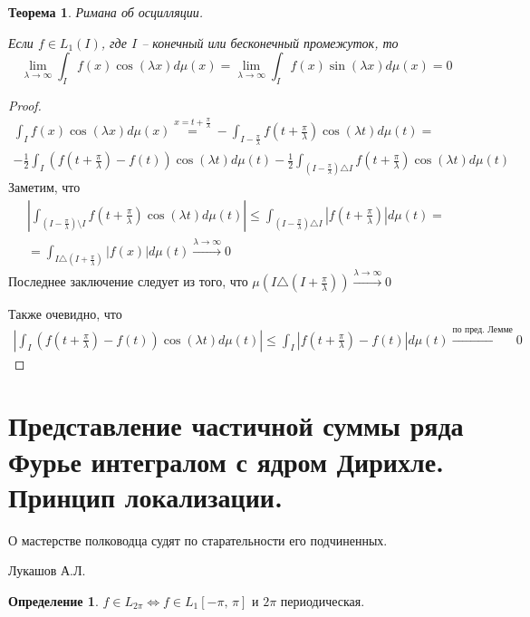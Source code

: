 \documentclass[a4paper,12pt]{article}
\renewcommand{\leq}{\ensuremath{\leqslant}}
\theoremstyle{plain}
\newtheorem{theorem}{Теорема}[section]
\theoremstyle{definition}
\newtheorem{definition}{Определение}[section]
\theoremstyle{remark}
\begin{document}
\begin{theorem}
	Римана об осцилляции.

	Если $f \in L_1(I)$, где $I$ -- конечный или бесконечный промежуток, то
	\[\lim_{\lambda \to \infty} \int_I f(x)\cos(\lambda x) d \mu(x) = \lim_{\lambda \to \infty} \int_I f(x) \sin (\lambda x) d\mu(x) = 0\]
\end{theorem}

\begin{proof}
	\begin{align*}
		\int_I f(x) \cos(\lambda x) d\mu(x) \stackrel{x = t + \frac{\pi}{\lambda}}{=} - \int_{I - \frac{\pi}{\lambda}} f\left( t + \frac{\pi}{\lambda} \right) \cos(\lambda t) d \mu(t) = \\
		-\frac{1}{2} \int_I \left(f\left(t + \frac{\pi}{\lambda}\right) - f(t) \right)\cos(\lambda t) d\mu(t) - \frac{1}{2} \int_{(I - \frac{\pi}{\lambda}) \triangle I} f\left(t + \frac{\pi}{\lambda}\right) \cos(\lambda t) d \mu(t)
	\end{align*}
	Заметим, что
	\begin{align*}
		\left|\int_{(I - \frac{\pi}{\lambda}) \setminus I} f\left(t + \frac{\pi}{\lambda}\right) \cos(\lambda t) d \mu(t)\right| \leq \int_{(I - \frac{\pi}{\lambda}) \triangle I} \left|f\left(t + \frac{\pi}{\lambda}\right)\right| d\mu(t) = \\
		= \int_{I \triangle (I + \frac{\pi}{\lambda})} |f(x)|d\mu(t) \stackrel{\lambda \to \infty}{\to} 0
	\end{align*}
	Последнее заключение следует из того, что $\mu\left(I \triangle (I + \frac{\pi}{\lambda})\right) \stackrel{\lambda \to \infty}{\to} 0$

	Также очевидно, что
	\begin{align*}
		\left|\int_I \left(f\left(t + \frac{\pi}{\lambda}\right) - f(t) \right)\cos(\lambda t) d\mu(t)\right| \leq \int_I \left|f\left(t + \frac{\pi}{\lambda}\right) - f(t)\right|d\mu(t) \stackrel{\text{по пред. Лемме}}{\to} 0
	\end{align*}
\end{proof}

\section{Представление частичной суммы ряда Фурье интегралом с ядром Дирихле. Принцип локализации.}

\epigraph{О мастерстве полководца судят по старательности его подчиненных.}{Лукашов А.Л.}

\begin{definition}
	$f \in L_{2\pi} \Leftrightarrow f \in L_1[-\pi,\,\pi]$ и $2\pi$ периодическая.
\end{definition}
\end{document}

